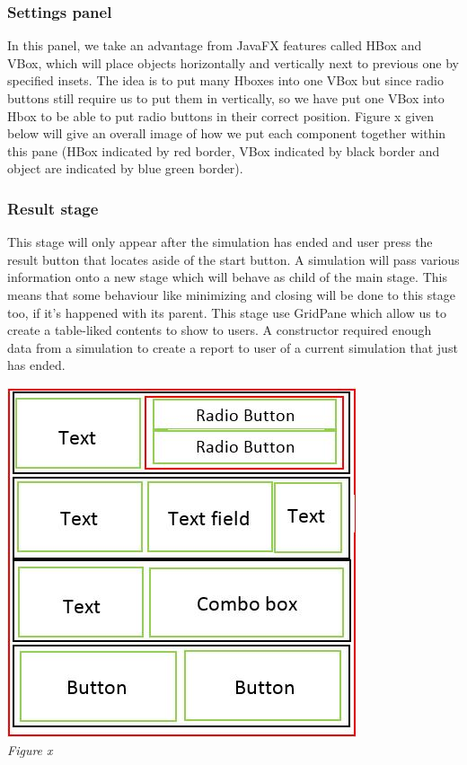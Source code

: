 \documentclass[11pt]{article}
\begin{document}
\subsubsection{Settings panel}
In this panel, we take an advantage from JavaFX features called HBox and VBox, which will place objects horizontally and vertically next to previous one by specified insets. The idea is to put many Hboxes into one VBox but since radio buttons still require us to put them in vertically, so we have put one VBox into Hbox to be able to put radio buttons in their correct position. Figure x given below will give an overall image of how we put each component together within this pane (HBox indicated by red border, VBox indicated by black border and object are indicated by blue green border).
\subsubsection{Result stage}
This stage will only appear after the simulation has ended and user press the result button that locates aside of the start button. A simulation will pass various information onto a new stage which will behave as child of the main stage. This means that some behaviour like minimizing and closing will be done to this stage too, if it's happened with its parent. This stage use GridPane which allow us to create a table-liked contents to show to users. A constructor required enough data from a simulation to create a report to user of a current simulation that just has ended.
\\
\begin{center}
\includegraphics{GUI_component}\\
\textit{Figure x}
\end{center}
\end{document}
